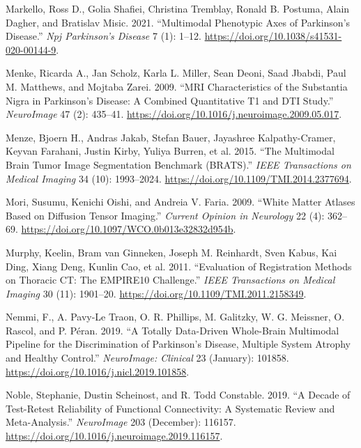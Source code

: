 \documentclass[
  table]{article}
\newlength{\cslhangindent}
\newenvironment{CSLReferences}[2] %
 {\begin{list}{}{%
  \setlength{\itemindent}{0pt}
  \setlength{\leftmargin}{0pt}
  \setlength{\parsep}{0pt}
  \ifodd #1
   \setlength{\leftmargin}{\cslhangindent}
   \setlength{\itemindent}{-1\cslhangindent}
  \fi
  \setlength{\itemsep}{#2\baselineskip}}}
 {\end{list}}
\begin{document}
\begin{CSLReferences}{1}{0}
Markello, Ross D., Golia Shafiei, Christina Tremblay, Ronald B. Postuma,
Alain Dagher, and Bratislav Misic. 2021. {``Multimodal Phenotypic Axes
of {Parkinson}{'}s Disease.''} \emph{Npj Parkinson's Disease} 7 (1):
1--12. \url{https://doi.org/10.1038/s41531-020-00144-9}.

Menke, Ricarda A., Jan Scholz, Karla L. Miller, Sean Deoni, Saad Jbabdi,
Paul M. Matthews, and Mojtaba Zarei. 2009. {``{MRI} Characteristics of
the Substantia Nigra in {Parkinson}'s Disease: {A} Combined Quantitative
{T1} and {DTI} Study.''} \emph{NeuroImage} 47 (2): 435--41.
\url{https://doi.org/10.1016/j.neuroimage.2009.05.017}.

Menze, Bjoern H., Andras Jakab, Stefan Bauer, Jayashree Kalpathy-Cramer,
Keyvan Farahani, Justin Kirby, Yuliya Burren, et al. 2015. {``The
{Multimodal} {Brain} {Tumor} {Image} {Segmentation} {Benchmark}
({BRATS}).''} \emph{IEEE Transactions on Medical Imaging} 34 (10):
1993--2024. \url{https://doi.org/10.1109/TMI.2014.2377694}.

Mori, Susumu, Kenichi Oishi, and Andreia V. Faria. 2009. {``White Matter
Atlases Based on Diffusion Tensor Imaging.''} \emph{Current Opinion in
Neurology} 22 (4): 362--69.
\url{https://doi.org/10.1097/WCO.0b013e32832d954b}.

Murphy, Keelin, Bram van Ginneken, Joseph M. Reinhardt, Sven Kabus, Kai
Ding, Xiang Deng, Kunlin Cao, et al. 2011. {``Evaluation of
{Registration} {Methods} on {Thoracic} {CT}: {The} {EMPIRE10}
{Challenge}.''} \emph{IEEE Transactions on Medical Imaging} 30 (11):
1901--20. \url{https://doi.org/10.1109/TMI.2011.2158349}.

Nemmi, F., A. Pavy-Le Traon, O. R. Phillips, M. Galitzky, W. G.
Meissner, O. Rascol, and P. Péran. 2019. {``A Totally Data-Driven
Whole-Brain Multimodal Pipeline for the Discrimination of {Parkinson}'s
Disease, Multiple System Atrophy and Healthy Control.''}
\emph{NeuroImage: Clinical} 23 (January): 101858.
\url{https://doi.org/10.1016/j.nicl.2019.101858}.

Noble, Stephanie, Dustin Scheinost, and R. Todd Constable. 2019. {``A
Decade of Test-Retest Reliability of Functional Connectivity: {A}
Systematic Review and Meta-Analysis.''} \emph{NeuroImage} 203
(December): 116157.
\url{https://doi.org/10.1016/j.neuroimage.2019.116157}.


\end{CSLReferences}
\end{document}
